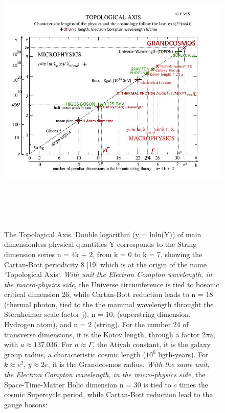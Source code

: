 \documentclass[twoside,draft]{article}
\begin{document}
\begin{sloppypar}
\begin{figure}
\centering
\includegraphics[width=\textwidth,height=14cm]{./figures/figure}
\caption{The Topological Axis. Double logarithm (y = lnln(Y)) of main dimensionless physical quantities 
Y corresponds to the String dimension series n = 4k + 2, from k = 0 to k = 7, showing the Cartan-Bott
periodicity 8 [19] which is at the origin of the name `Topological Axis`. 
\textit{With unit the Electron Compton wavelength, in the macro-physics side}, the Universe circumference 
    is tied to bosonic critical dimension 26, while Cartan-Bott reduction leads to n = 18 (thermal photon, 
    tied to the the mammal wavelength throught the Sternheimer scale factor j), n = 10, (superstring 
    dimension, Hydrogen atom), and n = 2 (string). For the number 24 of transverse dimensions, it is
    the Kotov length, through a factor 2$\pi$a, with $a \approx 137.036$. For $n \approx \Gamma $, the Atiyah constant, it is the galaxy group radius, a characteristic cosmic length ($10^{6}$ ligth-years). For $k \approx e^{2}$, $y\approx 2e$, it is 
    the Grandcosmos radius.
   \textit{With the same unit, the Electron Compton wavelength, in the micro-physics side}, the Space-Time-Matter
    Holic dimension n = 30 is tied to $c$ times the cosmic Supercycle period, while Cartan-Bott reduction lead to the gauge bosons:
}
\end{figure}
\end{sloppypar}
\end{document}
